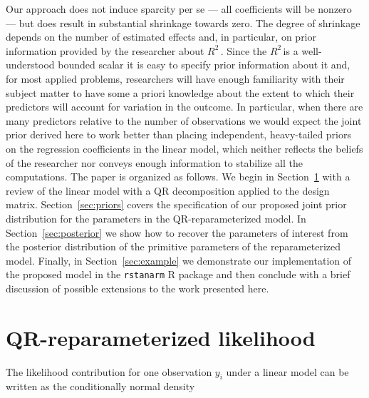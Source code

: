 \documentclass[11pt]{article}
\newcommand{\Rsq}{$R^2\,$}
\begin{document}
Our approach does not induce sparcity per se --- all coefficients will be
nonzero --- but does result in substantial shrinkage towards zero. The degree of
shrinkage depends on the number of estimated effects and, in particular, on
prior information provided by the researcher about \Rsq. Since the \Rsq is a
well-understood bounded scalar it is easy to specify prior information about it
and, for most applied problems, researchers will have enough familiarity with
their subject matter to have some a priori knowledge about the extent to which
their predictors will account for variation in the outcome. In particular, when
there are many predictors relative to the number of observations we would expect
the joint prior derived here to work better than placing independent,
heavy-tailed priors on the regression coefficients in the linear model, which
neither reflects the beliefs of the researcher nor conveys enough information to
stabilize all the computations.
The paper is organized as follows. We begin in Section~\ref{sec:likelihood} with
a review of the linear model with a QR decomposition applied to the design
matrix. Section~\ref{sec:priors} covers the specification of our proposed joint
prior distribution for the parameters in the QR-reparameterized model. In
Section~\ref{sec:posterior} we show how to recover the parameters of interest
from the posterior distribution of the primitive parameters of the
reparameterized model. Finally, in Section~\ref{sec:example} we demonstrate our
implementation of the proposed model in the {\tt rstanarm} R package and then
conclude with a brief discussion of possible extensions to the work presented
here.

\section{QR-reparameterized likelihood}
\label{sec:likelihood}

The likelihood contribution for one observation $y_i$ under a linear model
can be written as the conditionally normal density
\end{document}
